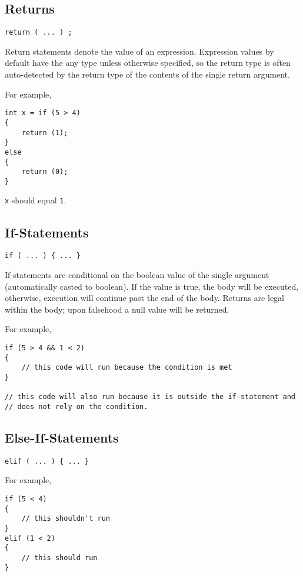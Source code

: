 \documentclass[10pt,a4paper]{article}
\begin{document}
\subsection{Returns}
\begin{verbatim}
return ( ... ) ;
\end{verbatim}

Return statements denote the value of an expression. Expression values by default have the any type unless otherwise specified, so the return type is often auto-detected by the return type of the contents of the single return argument.

For example,
\begin{verbatim}
int x = if (5 > 4)
{
    return (1);
}
else
{
    return (0);
}
\end{verbatim}
\verb|x| should equal \verb|1|.

\subsection{If-Statements}
\label{sec:ifStatements}
\begin{verbatim}
if ( ... ) { ... }
\end{verbatim}

If-statements are conditional on the boolean value of the single argument (automatically casted to boolean). If the value is true, the body will be executed, otherwise, execution will continue past the end of the body. Returns are legal within the body; upon falsehood a null value will be returned.

For example,
\begin{verbatim}
if (5 > 4 && 1 < 2)
{
    // this code will run because the condition is met
}

// this code will also run because it is outside the if-statement and
// does not rely on the condition. 
\end{verbatim}

\subsection{Else-If-Statements}
\begin{verbatim}
elif ( ... ) { ... }
\end{verbatim}

For example,
\begin{verbatim}
if (5 < 4)
{
    // this shouldn't run
}
elif (1 < 2)
{
    // this should run
}
\end{verbatim}
\end{document}
